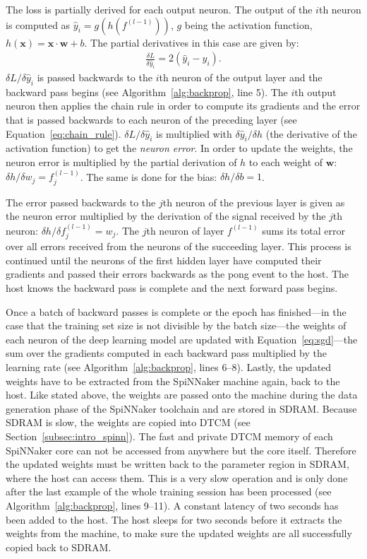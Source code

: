 \documentclass[]{article}
\begin{document}
The loss is partially derived for each output neuron.
The output of the $i$th neuron is computed as
$\hat{y}_i = g(h(f^{(l-1)}))$, $g$ being the activation function,
$h(\mathbf{x}) = \mathbf{x} \cdot \mathbf{w} + b$.
The partial derivatives in this case are given by:
\begin{align}
  \frac{\delta L}{\delta \hat{y}_i} = 2(\hat{y}_i - y_i).
\end{align}
$\delta L / \delta \hat{y}_i$ is passed backwards to the $i$th neuron
of the output layer and the backward pass begins (see
Algorithm~\ref{alg:backprop}, line 5).
The $i$th output neuron then applies the chain rule in order to
compute its gradients and the error that is passed backwards to each
neuron of the preceding layer (see Equation~\ref{eq:chain_rule}).
$\delta L / \delta \hat{y}_i$ is multiplied with
$\delta \hat{y}_i / \delta h$ (the derivative of the activation
function) to get the \textit{neuron error}.
In order to update the weights, the neuron error is multiplied by the
partial derivation of $h$ to each weight of $\mathbf{w}$:
$\delta h / \delta w_j = f^{(l - 1)}_j$.
The same is done for the bias: $\delta h / \delta b = 1$.

The error passed backwards to the $j$th neuron of the previous layer
is given as the neuron error multiplied by the derivation of the
signal received by the $j$th neuron:
$\delta h / \delta f^{(l-1)}_j = w_j$.
The $j$th neuron of layer $f^{(l-1)}$ sums its total error over all
errors received from the neurons of the succeeding layer.
This process is continued until the neurons of the first hidden layer
have computed their gradients and passed their errors backwards as
the pong event to the host.
The host knows the backward pass is complete and the next
forward pass begins.

Once a batch of backward passes is complete or the epoch has
finished---in the case that the training set size is not divisible by
the batch size---the weights of each neuron of the deep learning model
are updated with
Equation~\ref{eq:sgd}---the sum over the gradients computed in each
backward pass multiplied by the learning rate
(see Algorithm~\ref{alg:backprop}, lines 6--8).
Lastly, the updated weights have to be extracted from the SpiNNaker
machine again, back to the host.
Like stated above, the weights are passed onto the machine during the
data generation phase of the SpiNNaker toolchain and are stored in
SDRAM.
Because SDRAM is slow, the weights are copied into DTCM (see
Section~\ref{subsec:intro_spinn}).
The fast and private DTCM memory of each SpiNNaker core can not be
accessed from anywhere but the core itself.
Therefore the updated weights must be written back to the parameter
region in SDRAM, where the host can access them.
This is a very slow operation and is only done after the last
example of the whole training session has been processed
(see Algorithm~\ref{alg:backprop}, lines 9--11).
A constant latency of two seconds has been added to the host.
The host sleeps for two seconds before it extracts the weights from
the machine, to make sure the updated weights are all successfully
copied back to SDRAM.
\end{document}

